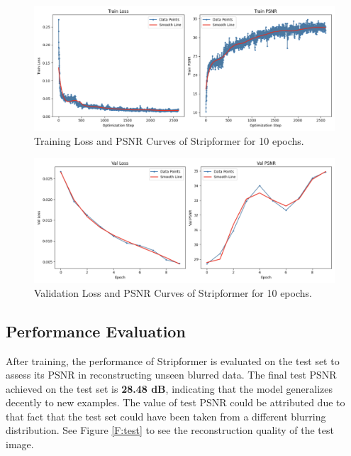 \documentclass[12pt, a4paper, twoside]{article}
\begin{document}
			\begin{figure}[hbt!]
				\centering
				\includegraphics[width=\textwidth]{train.png}
				\caption{Training Loss and PSNR Curves of Stripformer for 10 epochs.}
				\label{F:train}
			\end{figure}
			
			\begin{figure}[hbt!]
				\centering
				\includegraphics[width=\textwidth]{val.png}
				\caption{Validation Loss and PSNR Curves of Stripformer for 10 epochs.}
				\label{F:val}
			\end{figure}
		
		\subsection{Performance Evaluation}
			After training, the performance of Stripformer is evaluated on the test set to assess its PSNR in reconstructing unseen blurred data. The final test PSNR achieved on the test set is \textbf{28.48 dB}, indicating that the model generalizes decently to new examples. The value of test PSNR could be attributed due to that fact that the test set could have been taken from a different blurring distribution. See Figure \ref{F:test} to see the reconstruction quality of the test image.
			
\end{document}

